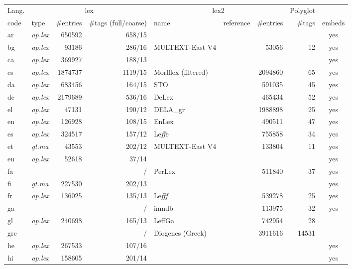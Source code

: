 \documentclass[11pt,letterpaper]{article}
\begin{document}
\begin{table}
\centering
\scriptsize
\begin{tabular}{l|lrr|llrrc}
\toprule
Lang. & \multicolumn{3}{c}{\sc lex} & \multicolumn{3}{|c}{\sc lex2} & Polyglot\\
code & type & \#entries & \#tags (full/coarse) & name & reference & \#entries & \#tags & embeds\\
\midrule
ar & {\em ap.lex} & 650592 & 658/15 &  &  &  &  & yes\\
bg & {\em ap.lex} & 93186 & 286/16 & MULTEXT-East V4 & \citep{erjavec10} & 53056 & 12 & yes\\
ca & {\em ap.lex} & 369927 & 188/13 &  &  &  &  & yes\\
cs & {\em ap.lex} & 1874737 & 1119/15 & Morfflex (filtered) & \citep{hajic13} & 2094860 & 65 & yes\\
da & {\em ap.lex} & 683456 & 164/15 & STO & \citep{braasch08} & 591035 & 45 & yes\\
de & {\em ap.lex} & 2179689 & 536/16 & DeLex & \citep{sagot14delex} & 465434 & 52 & yes\\
el & {\em ap.lex} & 47131 & 190/12 & DELA\_gr & \citep{symeonidis99} & 1988898 & 25 & yes\\
en & {\em ap.lex} & 126928 & 108/15 & EnLex & \citep{sagot10lefff} & 490511 & 47 & yes\\
es & {\em ap.lex} & 324517 & 157/12 & Le{\it ff}e & \citep{molinero09} & 755858 & 34 & yes\\
et & {\em gt.ma} & 43553 & 202/12 & MULTEXT-East V4 & \citep{erjavec10} & 133804 & 11 & yes\\
eu & {\em ap.lex} & 52618 & 37/14 &  &  &  &  & yes\\
fa &  &  & / & PerLex & \citep{sagot10perlex} & 511840 & 37 & yes\\
fi & {\em gt.ma} & 227530 & 202/13 &  &  &  &  & yes\\
fr & {\em ap.lex} & 136025 & 135/13 & Le{\it fff} & \citep{sagot10lefff} & 539278 & 25 & yes\\
ga &  &  & / & inmdb & \citep{mechura14} & 113975 & 32 & yes\\
gl & {\em ap.lex} & 240698 & 165/13 & LeffGa & \citep{sagot10lefff} & 742954 & 28 & \\
grc &  &  & / & Diogenes (Greek) & \citep{heslin07} & 3911616 & 14531 & \\
he & {\em ap.lex} & 267533 & 107/16 &  &  &  &  & yes\\
hi & {\em ap.lex} & 158605 & 201/14 &  &  &  &  & yes\\

\end{tabular}
\end{table}
\end{document}
